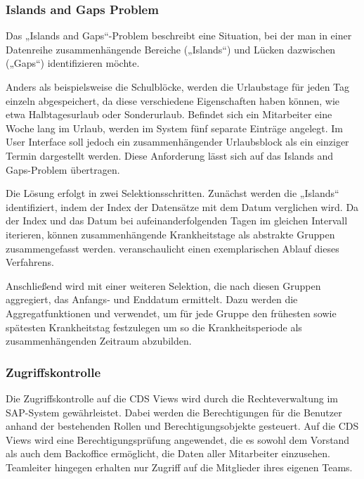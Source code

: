 \subsubsection{Islands and Gaps Problem}
\label{sec:Islands and Gaps Problem}

Das „Islands and Gaps“-Problem beschreibt eine Situation, bei der man in einer Datenreihe zusammenhängende Bereiche („Islands“) und Lücken dazwischen („Gaps“) identifizieren möchte. 

Anders als beispielsweise die Schulblöcke, werden die Urlaubstage für jeden Tag einzeln abgespeichert, da diese verschiedene Eigenschaften haben können, wie etwa Halbtagesurlaub oder Sonderurlaub. Befindet sich ein Mitarbeiter eine Woche lang im Urlaub, werden im System fünf separate Einträge angelegt. Im User Interface soll jedoch ein zusammenhängender Urlaubsblock als ein einziger Termin dargestellt werden. Diese Anforderung lässt sich auf das Islands and Gaps-Problem übertragen.

Die Lösung erfolgt in zwei Selektionsschritten. Zunächst werden die „Islands“ identifiziert, indem der Index der Datensätze mit dem Datum verglichen wird. Da der Index und das Datum bei aufeinanderfolgenden Tagen im gleichen Intervall iterieren, können zusammenhängende Krankheitstage als abstrakte Gruppen zusammengefasst werden.  veranschaulicht einen exemplarischen Ablauf dieses Verfahrens.


Anschließend wird mit einer weiteren Selektion, die nach diesen Gruppen aggregiert, das Anfangs- und Enddatum ermittelt. Dazu werden die Aggregatfunktionen  und  verwendet, um für jede Gruppe den frühesten sowie spätesten Krankheitstag festzulegen um so die Krankheitsperiode als zusammenhängenden Zeitraum abzubilden.

\subsubsection{Zugriffskontrolle}
\label{sec:Zugriffskontrolle}
Die Zugriffskontrolle auf die CDS Views wird durch die Rechteverwaltung im SAP-System gewährleistet. Dabei werden die Berechtigungen für die Benutzer anhand der bestehenden Rollen und Berechtigungsobjekte gesteuert. Auf die CDS Views wird eine Berechtigungsprüfung angewendet, die es sowohl dem Vorstand als auch dem Backoffice ermöglicht, die Daten aller Mitarbeiter einzusehen. Teamleiter hingegen erhalten nur Zugriff auf die Mitglieder ihres eigenen Teams.

